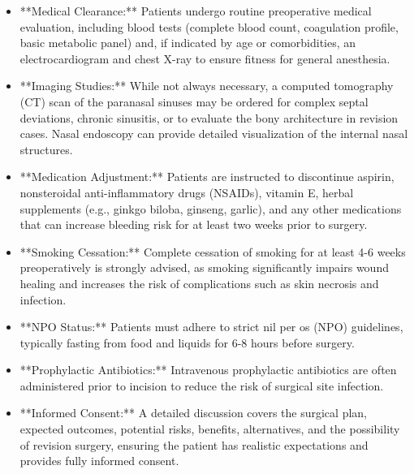 \begin{itemize}
  \item **Medical Clearance:** Patients undergo routine preoperative medical evaluation, including blood tests (complete blood count, coagulation profile, basic metabolic panel) and, if indicated by age or comorbidities, an electrocardiogram and chest X-ray to ensure fitness for general anesthesia.
  
  \item **Imaging Studies:** While not always necessary, a computed tomography (CT) scan of the paranasal sinuses may be ordered for complex septal deviations, chronic sinusitis, or to evaluate the bony architecture in revision cases. Nasal endoscopy can provide detailed visualization of the internal nasal structures.
  
  \item **Medication Adjustment:** Patients are instructed to discontinue aspirin, nonsteroidal anti-inflammatory drugs (NSAIDs), vitamin E, herbal supplements (e.g., ginkgo biloba, ginseng, garlic), and any other medications that can increase bleeding risk for at least two weeks prior to surgery.
  
  \item **Smoking Cessation:** Complete cessation of smoking for at least 4-6 weeks preoperatively is strongly advised, as smoking significantly impairs wound healing and increases the risk of complications such as skin necrosis and infection.
  
  \item **NPO Status:** Patients must adhere to strict nil per os (NPO) guidelines, typically fasting from food and liquids for 6-8 hours before surgery.
  
  \item **Prophylactic Antibiotics:** Intravenous prophylactic antibiotics are often administered prior to incision to reduce the risk of surgical site infection.
  
  \item **Informed Consent:** A detailed discussion covers the surgical plan, expected outcomes, potential risks, benefits, alternatives, and the possibility of revision surgery, ensuring the patient has realistic expectations and provides fully informed consent.
\end{itemize}

